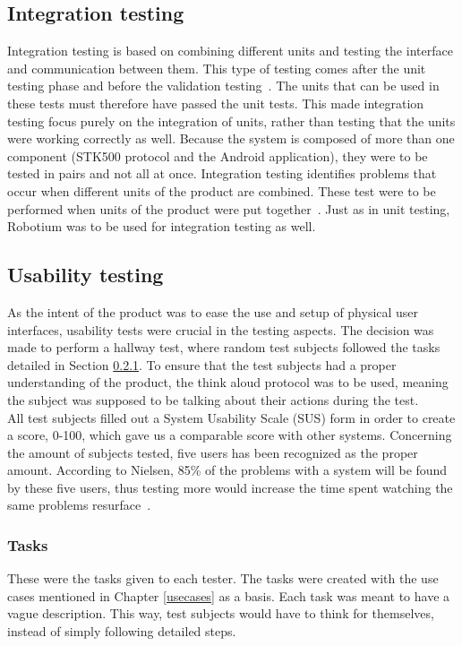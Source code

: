 		\subsection{Integration testing}
		Integration testing is based on combining different units and testing the interface and communication between them. This type of testing comes after the unit testing phase and before the validation testing~\cite{validation-testing}. The units that can be used in these tests must therefore have passed the unit tests. This made integration testing focus purely on the integration of units, rather than testing that the units were working correctly as well. Because the system is composed of more than one component (STK500 protocol and the Android application), they were to be tested in pairs and not all at once. Integration testing identifies problems that occur when different units of the product are combined. These test were to be performed when units of the product were put together~\cite{integration-testing2}. Just as in unit testing, Robotium was to be used for integration testing as well.\\

		\subsection{Usability testing}
		As the intent of the product was to ease the use and setup of physical user interfaces, usability tests were crucial in the testing aspects. The decision was made to perform a hallway test, where random test subjects followed the tasks detailed in Section \ref{taskssection}. To ensure that the test subjects had a proper understanding of the product, the think aloud protocol was to be used, meaning the subject was supposed to be talking about their actions during the test.\\
		\newline
		All test subjects filled out a System Usability Scale (SUS) form in order to create a score, 0-100, which gave us a comparable score with other systems. Concerning the amount of subjects tested, five users has been recognized as the proper amount. According to Nielsen, 85\% of the problems with a system will be found by these five users, thus testing more would increase the time spent watching the same problems resurface~\cite{Nielsen}.

		\subsubsection{Tasks}
		\label{taskssection}
			These were the tasks given to each tester. The tasks were created with the use cases mentioned in Chapter \ref{usecases} as a basis. Each task was meant to have a vague description. This way, test subjects would have to think for themselves, instead of simply following detailed steps. \\

